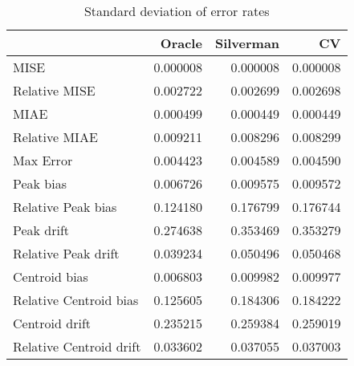 \begin{table}[H]
\centering
\begin{tabular}{lrrr}
  \hline
 & Oracle & Silverman & CV \\ 
  \hline
MISE & 0.000008 & 0.000008 & 0.000008 \\ 
  Relative MISE & 0.002722 & 0.002699 & 0.002698 \\ 
  MIAE & 0.000499 & 0.000449 & 0.000449 \\ 
  Relative MIAE & 0.009211 & 0.008296 & 0.008299 \\ 
  Max Error & 0.004423 & 0.004589 & 0.004590 \\ 
  Peak bias & 0.006726 & 0.009575 & 0.009572 \\ 
  Relative Peak bias & 0.124180 & 0.176799 & 0.176744 \\ 
  Peak drift & 0.274638 & 0.353469 & 0.353279 \\ 
  Relative Peak drift & 0.039234 & 0.050496 & 0.050468 \\ 
  Centroid bias & 0.006803 & 0.009982 & 0.009977 \\ 
  Relative Centroid bias & 0.125605 & 0.184306 & 0.184222 \\ 
  Centroid drift & 0.235215 & 0.259384 & 0.259019 \\ 
  Relative Centroid drift & 0.033602 & 0.037055 & 0.037003 \\ 
   \hline
\end{tabular}
\caption{Standard deviation of error rates} 
\label{tbl:stddev_error_rates}
\end{table}

